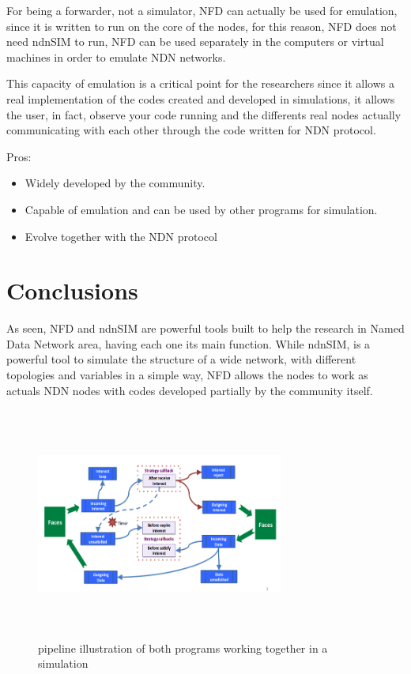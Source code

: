 \documentclass[preprint,12pt]{elsarticle}
\begin{document}
For being a forwarder, not a simulator, NFD can actually be used for emulation, since it is written to run on the core of the nodes, for this reason, NFD does not need ndnSIM to run, NFD can be used separately in the computers or virtual machines in order to emulate NDN networks.\par
This capacity of emulation is a critical point for the researchers since it allows a real implementation of the codes created and developed in simulations, it allows the user, in fact, observe your code running and the differents real nodes actually communicating with each other through the code written for NDN protocol.\par
Pros:
\begin{itemize}
		\item Widely developed by the community.
		
		\item Capable of emulation and can be used by other programs for simulation.
		
		\item Evolve together with the NDN protocol
		
	\end{itemize}
\section{Conclusions}
\label{S:3}
As seen, NFD and ndnSIM are powerful tools built to help the research in Named Data Network area, having each one its main function. While ndnSIM, is a powerful tool to simulate the structure of a wide network, with different topologies and variables in a simple way, NFD allows the nodes to work as actuals NDN nodes with codes developed partially by the community itself.\par
\begin{figure}[ht]
			\centering
			\includegraphics[height=3in, width=3.2in]{./Figures/Pipeline}
			\caption{pipeline illustration of both programs working together in a simulation}
			\label{fig:not_congested_results1}
		\end{figure} 
\end{document}
